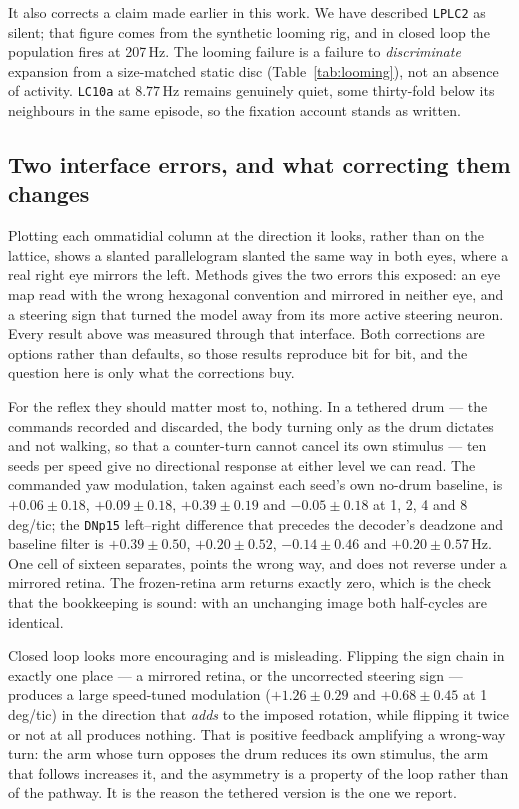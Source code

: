 \documentclass[10pt,twoside]{article}
\newcommand{\cell}[1]{\texttt{#1}}
\begin{document}
It also corrects a claim made earlier in this work. We have described
\cell{LPLC2} as silent; that figure comes from the synthetic looming rig, and
in closed loop the population fires at 207\,Hz. The looming failure is a
failure to \emph{discriminate} expansion from a size-matched static disc
(Table~\ref{tab:looming}), not an absence of activity. \cell{LC10a} at
$8.77$\,Hz remains genuinely quiet, some thirty-fold below its neighbours in
the same episode, so the fixation account stands as written.

\subsection{Two interface errors, and what correcting them changes}
\label{sec:interface}

Plotting each ommatidial column at the direction it looks, rather than on the
lattice, shows a slanted parallelogram slanted the same way in both eyes, where
a real right eye mirrors the left. Methods gives the two errors this exposed:
an eye map read with the wrong hexagonal convention and mirrored in neither
eye, and a steering sign that turned the model away from its more active
steering neuron. Every result above was measured through that interface. Both
corrections are options rather than defaults, so those results reproduce bit
for bit, and the question here is only what the corrections buy.

For the reflex they should matter most to, nothing. In a tethered drum --- the
commands recorded and discarded, the body turning only as the drum dictates and
not walking, so that a counter-turn cannot cancel its own stimulus --- ten
seeds per speed give no directional response at either level we can read. The
commanded yaw modulation, taken against each seed's own no-drum baseline, is
$+0.06\pm0.18$, $+0.09\pm0.18$, $+0.39\pm0.19$ and $-0.05\pm0.18$ at 1, 2, 4
and 8\,deg/tic; the \cell{DNp15} left--right difference that precedes the
decoder's deadzone and baseline filter is $+0.39\pm0.50$, $+0.20\pm0.52$,
$-0.14\pm0.46$ and $+0.20\pm0.57$\,Hz. One cell of sixteen separates, points
the wrong way, and does not reverse under a mirrored retina. The frozen-retina
arm returns exactly zero, which is the check that the bookkeeping is sound:
with an unchanging image both half-cycles are identical.

Closed loop looks more encouraging and is misleading. Flipping the sign chain
in exactly one place --- a mirrored retina, or the uncorrected steering sign
--- produces a large speed-tuned modulation ($+1.26\pm0.29$ and $+0.68\pm0.45$
at 1\,deg/tic) in the direction that \emph{adds} to the imposed rotation, while
flipping it twice or not at all produces nothing. That is positive feedback
amplifying a wrong-way turn: the arm whose turn opposes the drum reduces its
own stimulus, the arm that follows increases it, and the asymmetry is a
property of the loop rather than of the pathway. It is the reason the tethered
version is the one we report.
\end{document}
